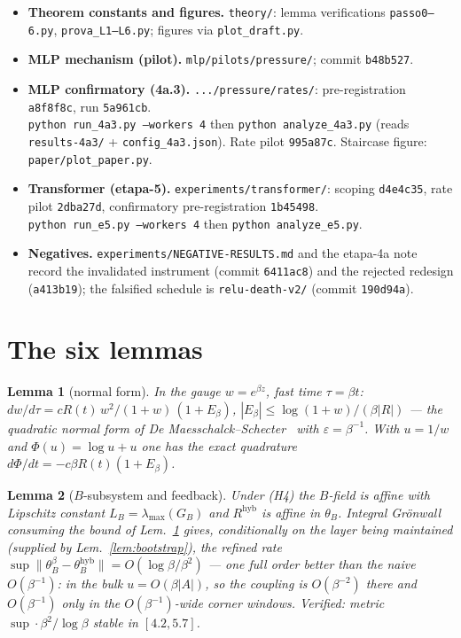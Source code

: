\documentclass[11pt]{article}
\newtheorem{lemma}{Lemma}
\begin{document}
{\sloppy
\begin{itemize}
\item \textbf{Theorem constants and figures.} \texttt{theory/}: lemma
verifications \texttt{passo0--6.py}, \texttt{prova\_L1--L6.py}; figures via
\texttt{plot\_draft.py}.
\item \textbf{MLP mechanism (pilot).}
\texttt{mlp/pilots/pressure/}; commit \texttt{b48b527}.
\item \textbf{MLP confirmatory (4a.3).} \texttt{.../pressure/rates/}: pre-registration
\texttt{a8f8f8c}, run \texttt{5a961cb}. \\
\texttt{python run\_4a3.py --workers 4} then \texttt{python analyze\_4a3.py}
(reads \texttt{results-4a3/} + \texttt{config\_4a3.json}). Rate pilot
\texttt{995a87c}. Staircase figure: \texttt{paper/plot\_paper.py}.
\item \textbf{Transformer (etapa-5).} \texttt{experiments/transformer/}:
scoping \texttt{d4e4c35}, rate pilot \texttt{2dba27d}, confirmatory
pre-registration \texttt{1b45498}. \\
\texttt{python run\_e5.py --workers 4} then \texttt{python analyze\_e5.py}.
\item \textbf{Negatives.} \texttt{experiments/NEGATIVE-RESULTS.md} and the etapa-4a
note record the invalidated instrument (commit \texttt{6411ac8}) and the rejected
redesign (\texttt{a413b19}); the falsified schedule is
\texttt{relu-death-v2/} (commit \texttt{190d94a}).
\end{itemize}
\par}

\appendix
\section{The six lemmas}\label{app:lemmas}

\begin{lemma}[normal form]\label{lem:gauge}
In the gauge $w=e^{\beta z}$, fast time $\tau=\beta t$:
$dw/d\tau=cR(t)\,w^2/(1+w)\,(1+E_\beta)$, $|E_\beta|\le\log(1+w)/(\beta|R|)$ ---
the quadratic normal form of De Maesschalck--Schecter~\cite{DMS16} with
$\varepsilon=\beta^{-1}$. With $u=1/w$ and $\Phi(u)=\log u+u$ one has the exact
quadrature $d\Phi/dt=-c\beta R(t)(1+E_\beta)$.
\end{lemma}

\begin{lemma}[$B$-subsystem and feedback]\label{lem:gronwall}
Under (H4) the $B$-field is affine with Lipschitz constant
$L_B=\lambda_{\max}(G_B)$ and $R^{\mathrm{hyb}}$ is affine in $\theta_B$. Integral
Gr\"onwall consuming the bound of Lem.~\ref{lem:gauge} gives, conditionally on the
layer being maintained (supplied by Lem.~\ref{lem:bootstrap}), the refined rate
$\sup\|\theta_B^\beta-\theta_B^{\mathrm{hyb}}\|=O(\log\beta/\beta^{2})$ --- one
full order better than the naive $O(\beta^{-1})$: in the bulk $u=O(\beta|A|)$, so
the coupling is $O(\beta^{-2})$ there and $O(\beta^{-1})$ only in the
$O(\beta^{-1})$-wide corner windows. Verified: metric
$\sup\cdot\beta^2/\log\beta$ stable in $[4.2,5.7]$.
\end{lemma}
\end{document}
